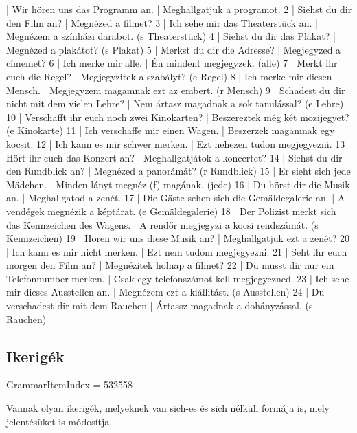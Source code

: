 \documentclass{article}
\newenvironment{desc}{\verbatim}{\endverbatim}
\newenvironment{exmp}{\verbatim}{\endverbatim}
\begin{document}
\begin{exmp}
1 | Wir hören uns das Programm an. | Meghallgatjuk a programot.
2 | Siehst du dir den Film an? | Megnézed a filmet?
3 | Ich sehe mir das Theaterstück an. | Megnézem a színházi darabot. (s Theaterstück)
4 | Siehst du dir das Plakat? | Megnézed a plakátot? (s Plakat)
5 | Merkst du dir die Adresse? | Megjegyzed a címemet?
6 | Ich merke mir alle. | Én mindent megjegyzek. (alle)
7 | Merkt ihr euch die Regel? | Megjegyzitek a szabályt? (e Regel)
8 | Ich merke mir diesen Mensch. | Megjegyzem magamnak ezt az embert. (r Mensch)
9 | Schadest du dir nicht mit dem vielen Lehre? | Nem ártasz magadnak a sok tanulással? (e Lehre)
10 | Verschafft ihr euch noch zwei Kinokarten? | Beszereztek még két mozijegyet? (e Kinokarte)
11 | Ich verschaffe mir einen Wagen. | Beszerzek magamnak egy kocsit.
12 | Ich kann es mir schwer merken. | Ezt nehezen tudon megjegyezni.
13 | Hört ihr euch das Konzert an? | Meghallgatjátok a koncertet?
14 | Siehst du dir den Rundblick an? | Megnézed a panorámát? (r Rundblick)
15 | Er sieht sich jede Mädchen. | Minden lányt megnéz (f) magának. (jede)
16 | Du hörst dir die Musik an. | Meghallgatod a zenét.
17 | Die Gäste sehen sich die Gemäldegalerie an. | A vendégek megnézik a képtárat. (e Gemäldegalerie)
18 | Der Polizist merkt sich das Kennzeichen des Wagens. | A rendőr megjegyzi a kocsi rendszámát. (s Kennzeichen)
19 | Hören wir uns diese Musik an? | Meghallgatjuk ezt a zenét?
20 | Ich kann es mir nicht merken. | Ezt nem tudom megjegyezni.
21 | Seht ihr euch morgen den Film an? | Megnézitek holnap a filmet?
22 | Du musst dir nur ein Telefonnumber merken. | Csak egy telefonszámot kell megjegyezned.
23 | Ich sehe mir dieses Ausstellen an. | Megnézem ezt a kiállitást. (s Ausstellen)
24 | Du verschadest dir mit dem Rauchen | Ártassz magadnak a dohányzással. (s Rauchen)
\end{exmp}

\subsection{Ikerigék}

GrammarItemIndex = 532558

\begin{desc}
Vannak olyan ikerigék, melyeknek van sich-es és sich nélküli formája is, mely jelentésüket is módosítja.
\end{desc}

\begin{exmp}
\end{exmp}
\end{document}
